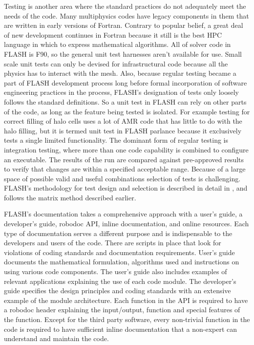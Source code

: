 Testing is another area where the standard practices do not adequately
meet the needs of the code. Many multiphysics codes have legacy
components in them that are written in early versions of
Fortran. Contrary to popular belief, a great deal of new development
continues in Fortran because it still is the best HPC language
in which to express mathematical algorithms. All of solver code in
FLASH is F90, so the general unit test harnesses aren't available for
use. Small scale unit tests can only be devised for infrastructural
code because all the physics has to interact with the mesh. Also,
because regular testing became a part of FLASH development process
long before formal incorporation of software engineering practices in
the process, FLASH's designation of tests only loosely follows the
standard definitions. So a unit test in FLASH can rely on other parts
of the code, as long as the feature being tested is isolated. For
example testing for correct filling of halo cells uses a lot of AMR
code that has little to do with the halo filling, but it is termed
unit test in FLASH parlance because it exclusively tests a single
limited functionality. The dominant form of regular testing is
integration testing, where more than one code capability is combined to
configure an executable. The results of the run are compared against
pre-approved results to verify that changes are within a specified
acceptable range. Because of a
large space of possible valid and useful combinations selection of tests
is challenging. FLASH's methodology for test design and
selection is described in detail in \cite{Dubey2015}, and follows the
matrix method described earlier.

FLASH's documentation takes a comprehensive approach with a
user's guide, a developer's guide, robodoc API, inline documentation,
and online resources. Each type of documentation serves a different
purpose and is indispensable to the developers and users of the code.  
There are scripts in place that look for violations of coding
standards and documentation requirements. User's guide documents the
mathematical formulation, algorithms used and instructions on using
various code components. The user's guide also includes examples of
relevant applications explaining the use of each code module. The
developer's guide specifies the design principles and coding standards
with an extensive example of the module architecture. Each function in
the API is required to have a robodoc header explaining the
input/output, function and special features of the function. Except
for the third party software, every non-trivial function in the code
is required to have sufficient inline documentation that a non-expert
can understand and maintain the code.

